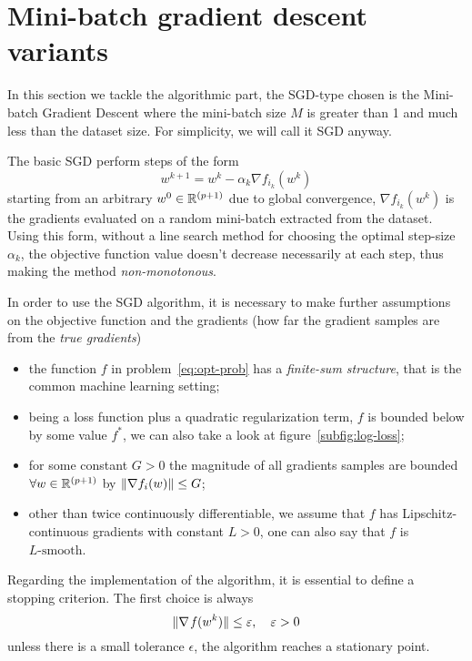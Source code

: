 \section{Mini-batch gradient descent variants}

In this section we tackle the algorithmic part, the SGD-type chosen is the Mini-batch Gradient Descent where the mini-batch size $M$ is greater than 1 and much less than the dataset size. For simplicity, we will call it SGD anyway.

The basic SGD perform steps of the form
\begin{equation}\label{eq:sgd_step}
w^{k+1}=w^k-\alpha_k\nabla f_{i_k}(w^k)
\end{equation}
starting from an arbitrary $w^0\in\mathbb{R}^{(p+1)}$ due to global convergence, $\nabla f_{i_k}(w^k)$ is the gradients evaluated on a random mini-batch extracted from the dataset. Using this form, without a line search method for choosing the optimal step-size $\alpha_k$, the objective function value doesn't decrease necessarily at each step, thus making the method \emph{non-monotonous}.

In order to use the SGD algorithm, it is necessary to make further assumptions on the objective function and the gradients (how far the gradient samples are from the \emph{true gradients})
\begin{itemize}
\item the function $f$ in problem~\eqref{eq:opt-prob} has a \emph{finite-sum structure}, that is the common machine learning setting;
\item being a loss function plus a quadratic regularization term, $f$ is bounded below by some value $f^\ast$, we can also take a look at figure~\ref{subfig:log-loss};
\item for some constant $G>0$ the magnitude of all gradients samples are bounded $\forall w\in\mathbb{R}^{(p+1)}$ by $\lVert\nabla f_i(w)\rVert\leq G$;
\item other than twice continuously differentiable, we assume that $f$ has Lipschitz-continuous gradients with constant $L>0$, one can also say that $f$ is $L\text{-smooth}$.
\end{itemize}

Regarding the implementation of the algorithm, it is essential to define a stopping criterion. The first choice is always
\begin{equation}\label{eq:stopping1}
\lVert\nabla\operatorname*{\mathit{f}}(w^k)\rVert\leq\varepsilon,\quad\varepsilon>0
\end{equation}
unless there is a small tolerance $\epsilon$, the algorithm reaches a stationary point.

